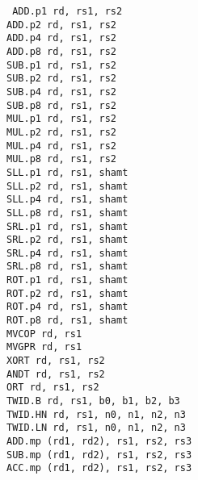 {\tt
ADD.p1  rd, rs1, rs2            \\
ADD.p2  rd, rs1, rs2            \\
ADD.p4  rd, rs1, rs2            \\
ADD.p8  rd, rs1, rs2            \\
SUB.p1  rd, rs1, rs2            \\
SUB.p2  rd, rs1, rs2            \\
SUB.p4  rd, rs1, rs2            \\
SUB.p8  rd, rs1, rs2            \\
MUL.p1  rd, rs1, rs2            \\
MUL.p2  rd, rs1, rs2            \\
MUL.p4  rd, rs1, rs2            \\
MUL.p8  rd, rs1, rs2            \\
SLL.p1  rd, rs1, shamt          \\
SLL.p2  rd, rs1, shamt          \\
SLL.p4  rd, rs1, shamt          \\
SLL.p8  rd, rs1, shamt          \\
SRL.p1  rd, rs1, shamt          \\
SRL.p2  rd, rs1, shamt          \\
SRL.p4  rd, rs1, shamt          \\
SRL.p8  rd, rs1, shamt          \\
ROT.p1  rd, rs1, shamt          \\
ROT.p2  rd, rs1, shamt          \\
ROT.p4  rd, rs1, shamt          \\
ROT.p8  rd, rs1, shamt          \\
MVCOP   rd, rs1                 \\
MVGPR   rd, rs1                 \\
XORT    rd, rs1, rs2            \\
ANDT    rd, rs1, rs2            \\
ORT     rd, rs1, rs2            \\
TWID.B  rd, rs1, b0, b1, b2, b3 \\
TWID.HN rd, rs1, n0, n1, n2, n3 \\
TWID.LN rd, rs1, n0, n1, n2, n3 \\
ADD.mp  (rd1, rd2),  rs1, rs2, rs3 \\
SUB.mp  (rd1, rd2),  rs1, rs2, rs3 \\
ACC.mp  (rd1, rd2),  rs1, rs2, rs3 \\
}
